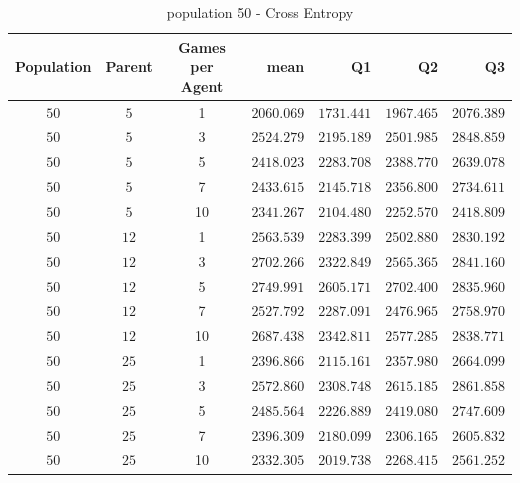 \begin{table}[H]
\centering
\small
\begin{tabular}{c c c r r r r}
Population & Parent & Games per Agent & mean & Q1 & Q2 & Q3\\
\hline
$50$ & $5$ & 1 & $2060.069$ & $1731.441$ & $1967.465$ & $2076.389$\\
\hdashline
$50$ & $5$ & 3 & $2524.279$ & $2195.189$ & $2501.985$ & $2848.859$\\
\hdashline
$50$ & $5$ & 5 & $2418.023$ & $2283.708$ & $2388.770$ & $2639.078$\\
$50$ & $5$ & 7 & $2433.615$ & $2145.718$ & $2356.800$ & $2734.611$\\
$50$ & $5$ & 10 & $2341.267$ & $2104.480$ & $2252.570$ & $2418.809$\\
$50$ & $12$ & 1 & $2563.539$ & $2283.399$ & $2502.880$ & $2830.192$\\
$50$ & $12$ & 3 & $2702.266$ & $2322.849$ & $2565.365$ & $2841.160$\\
\hdashline
$50$ & $12$ & 5 & $2749.991$ & $2605.171$ & $2702.400$ & $2835.960$\\
\hdashline
$50$ & $12$ & 7 & $2527.792$ & $2287.091$ & $2476.965$ & $2758.970$\\
$50$ & $12$ & 10 & $2687.438$ & $2342.811$ & $2577.285$ & $2838.771$\\
$50$ & $25$ & 1 & $2396.866$ & $2115.161$ & $2357.980$ & $2664.099$\\
\hdashline
$50$ & $25$ & 3 & $2572.860$ & $2308.748$ & $2615.185$ & $2861.858$\\
\hdashline
$50$ & $25$ & 5 & $2485.564$ & $2226.889$ & $2419.080$ & $2747.609$\\
$50$ & $25$ & 7 & $2396.309$ & $2180.099$ & $2306.165$ & $2605.832$\\
$50$ & $25$ & 10 & $2332.305$ & $2019.738$ & $2268.415$ & $2561.252$\\
\end{tabular}
\caption{population 50 - Cross Entropy}
\end{table}



